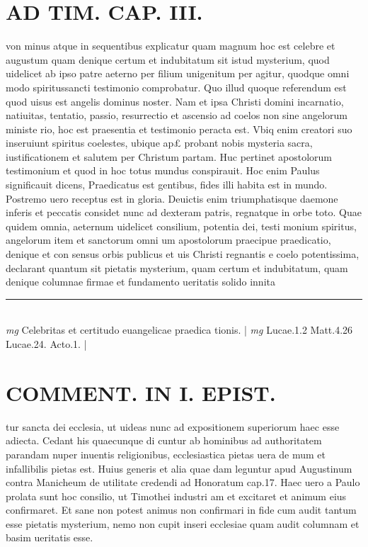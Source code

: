\documentclass{article}
\begin{document}
\begin{pages}
\section*{AD TIM. CAP. III. }
\marginpar{[ p.136 ]}\pstart von minus atque in sequentibus explicatur quam magnum hoc est celebre et augustum quam denique certum et indubitatum sit istud mysterium, quod uidelicet ab ipso patre aeterno per filium unigenitum per agitur, quodque omni modo spiritussancti testimonio comprobatur. Quo illud quoque referendum est quod uisus est angelis dominus noster. Nam et ipsa Christi domini incarnatio, natiuitas, tentatio, passio, resurrectio et ascensio ad coelos non sine angelorum ministe rio, hoc est praesentia et testimonio peracta est. Vbiq enim creatori suo inseruiunt spiritus coelestes, ubique ap£ probant nobis mysteria sacra, iustificationem et salutem per Christum partam. Huc pertinet apostolorum testimonium et quod in hoc totus mundus conspirauit. Hoc enim Paulus significauit dicens, Praedicatus est gentibus, fides illi habita est in mundo. Postremo uero receptus est in gloria. Deuictis enim triumphatisque daemone inferis et peccatis considet nunc ad dexteram patris, regnatque in orbe toto. Quae quidem omnia, aeternum uidelicet consilium, potentia dei, testi monium spiritus, angelorum item et sanctorum omni um apostolorum praecipue praedicatio, denique et con sensus orbis publicus et uis Christi regnantis e coelo potentissima, declarant quantum sit pietatis mysterium, quam certum et indubitatum, quam denique columnae firmae et fundamento ueritatis solido innita\pend
\vspace{0.5cm}\noindent
\vspace{0.2cm}\rule{1cm}{0.2pt}\\ 
\hspace{0.2cm}\textit{mg}
\footnotesize Celebritas et certitudo euangelicae praedica tionis. 
\normalsize| 
\hspace{0.2cm}\textit{mg}
\footnotesize Lucae.1.2 Matt.4.26 Lucae.24. Acto.1. 
\normalsize| 
\section*{COMMENT. IN I. EPIST. }\pstart tur sancta dei ecclesia, ut uideas nunc ad expositionem superiorum haec esse adiecta. Cedant his quaecunque di cuntur ab hominibus ad authoritatem parandam nuper inuentis religionibus, ecclesiastica pietas uera de mum et infallibilis pietas est. Huius generis et alia quae dam leguntur apud Augustinum contra Manicheum de utilitate credendi ad Honoratum cap.17. Haec uero a Paulo prolata sunt hoc consilio, ut Timothei industri am et excitaret et animum eius confirmaret. Et sane non potest animus non confirmari in fide cum audit tantum esse pietatis mysterium, nemo non cupit inseri ecclesiae quam audit columnam et basim ueritatis esse.  \pend
{}
{}

\end{pages}
\end{document}
